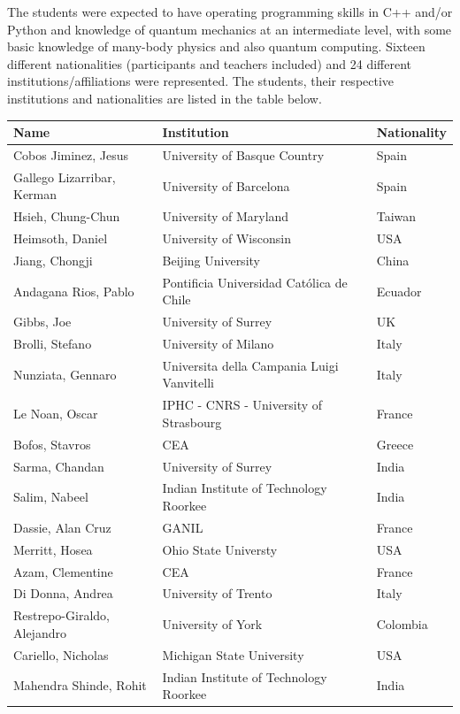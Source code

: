 \documentclass[prc,amsart,english]{revtex4-2}
\begin{document}
The students were expected to have operating programming skills in C++ and/or Python and knowledge of
quantum mechanics at an intermediate level, with some basic knowledge of 
many-body physics and also quantum computing. 
Sixteen different  nationalities (participants and teachers included) and 24 different institutions/affiliations 
were represented. 
The students, their respective institutions and nationalities are listed in the table below. 
\begin{table}[hbtp]
  \begin{ruledtabular}
    \begin{tabular}{|l||l|l|}
     Name & Institution &Nationality   \\\hline
Cobos Jiminez, Jesus & University of Basque Country & Spain\\
Gallego Lizarribar, Kerman  & University of Barcelona & Spain\\
Hsieh, Chung-Chun  & University of Maryland & Taiwan\\
Heimsoth, Daniel  & University of Wisconsin & USA\\
Jiang, Chongji  & Beijing University & China\\
Andagana Rios, Pablo  &  Pontificia Universidad Católica de Chile & Ecuador\\
Gibbs, Joe  & University of Surrey & UK \\
Brolli, Stefano  & University of Milano & Italy\\
Nunziata, Gennaro  & Universita della Campania Luigi Vanvitelli & Italy\\
Le Noan, Oscar  & IPHC - CNRS - University of Strasbourg & France \\
Bofos, Stavros  & CEA  & Greece\\
Sarma, Chandan  & University of Surrey & India\\
Salim, Nabeel  & Indian Institute of Technology Roorkee & India \\
Dassie, Alan Cruz  & GANIL & France \\
Merritt, Hosea  & Ohio State Universty  & USA\\
Azam, Clementine  & CEA & France\\
Di Donna, Andrea  & University of Trento & Italy\\
Restrepo-Giraldo, Alejandro  & University of York & Colombia\\
Cariello, Nicholas  & Michigan State University & USA\\
Mahendra Shinde, Rohit  & Indian Institute of Technology Roorkee & India\\

\end{tabular}
\end{ruledtabular}
\end{table}
\end{document}
